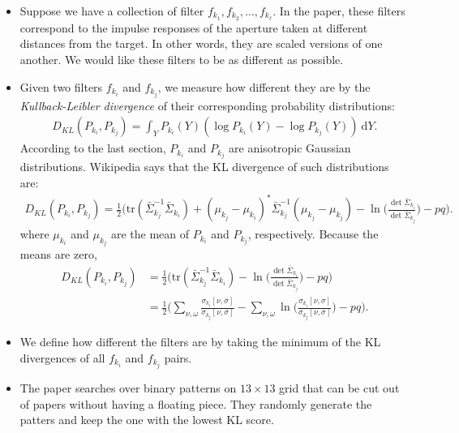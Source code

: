 \documentclass[10pt]{article}
\newcommand{\dee}{\mathrm{d}}
\newcommand{\tr}{\mathrm{tr}}
\begin{document}
\begin{itemize}
  \item Suppose we have a collection of filter $f_{k_1}, f_{k_2}, \dotsc, f_{k_\ell}$. In the paper, these filters correspond to the impulse responses of the aperture taken at different distances from the target. In other words, they are scaled versions of one another. We would like these filters to be as different as possible.
  
  \item Given two filters $f_{k_i}$ and $f_{k_j}$, we measure how different they are by the \emph{Kullback-Leibler divergence} of their corresponding probability distributions:
  \begin{align*}
    D_{KL}(P_{k_i}, P_{k_j}) = \int_{Y} P_{k_i}(Y)(\log P_{k_i}(Y) - \log P_{k_j}(Y) )\ \dee Y.
  \end{align*}
  According to the last section, $P_{k_i}$ and $P_{k_j}$ are anisotropic Gaussian distributions. Wikipedia says that the KL divergence of such distributions are:
  \begin{align*}
    D_{KL}(P_{k_i}, P_{k_j}) = \frac{1}{2}\bigg( \tr(\bar{\Sigma}^{-1}_{k_j} \bar{\Sigma}_{k_i} ) + (\mu_{k_j} - \mu_{k_i})^* \bar{\Sigma}_{k_j}^{-1} (\mu_{k_j} - \mu_{k_j}) - \ln \bigg( \frac{\det \bar{\Sigma}_{k_i} }{\det \bar{\Sigma}_{k_j}} \bigg) - pq \bigg).
  \end{align*}
  where $\mu_{k_i}$ and $\mu_{k_j}$ are the mean of $P_{k_i}$ and $P_{k_j}$, respectively. Because the means are zero,
  \begin{align*}
    D_{KL}(P_{k_i}, P_{k_j}) 
    &= \frac{1}{2}\bigg( \tr(\bar{\Sigma}^{-1}_{k_j}\bar{\Sigma}_{k_i} ) - \ln \bigg( \frac{\det \bar{\Sigma}_{k_i} }{\det \bar{\Sigma}_{k_j}} \bigg) - pq \bigg)\\
    &= \frac{1}{2} \bigg( \sum_{\nu, \omega} \frac{\sigma_{k_i}[\nu, \sigma]}{\sigma_{k_j}[\nu, \sigma]} - \sum_{\nu,\omega} \ln \bigg( \frac{\sigma_{k_i}[\nu, \sigma]}{\sigma_{k_j}[\nu, \sigma]} \bigg) -pq \bigg).
  \end{align*}
  
  \item We define how different the filters are by taking the minimum of the KL divergences of all $f_{k_i}$ and $f_{k_j}$ pairs.
  
  \item The paper searches over binary patterns on $13 \times 13$ grid that can be cut out of papers without having a floating piece. They randomly generate the patters and keep the one with the lowest KL score.
  
\end{itemize}
\end{document}
